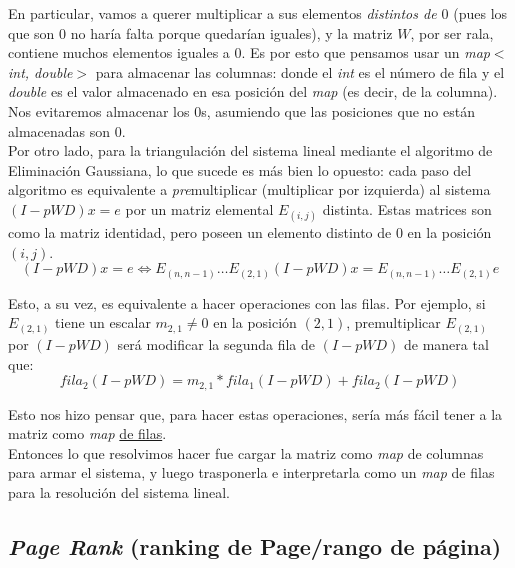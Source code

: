 		En particular, vamos a querer multiplicar a sus elementos \textit{distintos de $0$} (pues los que son $0$ no haría falta porque quedarían iguales), y la matriz $W$, por ser rala, contiene muchos elementos iguales a $0$. Es por esto que pensamos usar un \textit{map$<$int, double$>$} para almacenar las columnas: donde el \textit{int} es el número de fila y el \textit{double} es el valor almacenado en esa posición del \textit{map} (es decir, de la columna). Nos evitaremos almacenar los $0$s, asumiendo que las posiciones que no están almacenadas son $0$. \\

		Por otro lado, para la triangulación del sistema lineal mediante el algoritmo de Eliminación Gaussiana, lo que sucede es más bien lo opuesto: cada paso del algoritmo es equivalente a \textit{pre}multiplicar (multiplicar por izquierda) al sistema $(I - pWD) x = e$ por un matriz elemental $E_{(i,j)}$ distinta. Estas matrices son como la matriz identidad, pero poseen un elemento distinto de $0$ en la posición $(i,j)$. \\

		\begin{equation}
			(I - pWD) x = e \Leftrightarrow E_{(n,n-1)} \hdots E_{(2,1)} (I - pWD) x = E_{(n,n-1)} \hdots E_{(2,1)} e
		\end{equation}

		Esto, a su vez, es equivalente a hacer operaciones con las filas. Por ejemplo, si $E_{(2,1)}$ tiene un escalar $m_{2,1} \neq 0$ en la posición $(2,1)$, premultiplicar $E_{(2,1)}$ por $(I - pWD)$ será modificar la segunda fila de $(I - pWD)$ de manera tal que: \\

		\begin{equation}
			fila_{2}(I-pWD) = m_{2,1} *  fila_{1}(I-pWD) + fila_{2}(I-pWD)
		\end{equation}

		Esto nos hizo pensar que, para hacer estas operaciones, sería más fácil tener a la matriz como \textit{map} \underline{de filas}. \\

		Entonces lo que resolvimos hacer fue cargar la matriz como \textit{map} de columnas para armar el sistema, y luego trasponerla e interpretarla como un \textit{map} de filas para la resolución del sistema lineal. \\

	\subsection{\textit{Page Rank} (ranking de Page/rango de página)}


